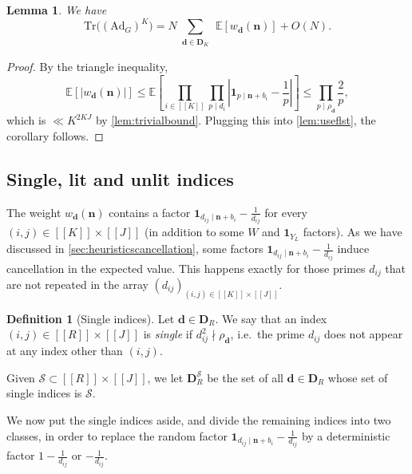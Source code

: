 \documentclass[11pt]{amsart}
\newtheorem{lemma}[theorem]{Lemma}
\theoremstyle{definition}
\newtheorem{definition}[theorem]{Definition}
\renewcommand{\leq}{\leqslant}
\newcommand{\sinterval}[1]{[\![#1]\!] }
\newcommand{\abs}[1]{\left|#1\right|}
\newcommand{\ind}[1]{\mathbf{1}_{#1}}
\newcommand{\E}{\mathbb{E}}
\newcommand{\Ad}{\mathrm{Ad}}
\newcommand{\Tr}{\mathrm{Tr}}
\renewcommand{\d}{\boldsymbol{d}}
\newcommand{\pcomp}[2]{d_{#1#2}}
\newcommand{\n}{\mathbf{n}}
\newcommand{\graph}{G}
\newcommand{\sommespart}{b}
\newcommand{\fprod}[1]{\rho_{#1}}
\newcommand{\pall}{\fprod{\d}}
\newcommand{\s}{\mathcal{S}}
\newcommand{\fancyD}{\mathbf{D}}
\newcommand{\Dsf}{\fancyD_{\!\repK}}
\newcommand{\DsfR}{\fancyD_{\!\tupsize}}
\newcommand{\DsR}{\fancyD^{\s}_{\!\tupsize}}
\newcommand{\elln}{L}
\newcommand{\Y}{Y_{\!\elln}}
\newcommand{\repR}{J}
\newcommand{\repK}{K}
\newcommand{\newK}{\sinterval{K}}
\newcommand{\newR}{\sinterval{J}}
\newcommand{\newerKR}{\newK\times\newR}
\newcommand{\newerKRR}{\sinterval{\tupsize}\times\newR}
\newcommand{\tupsize}{R}
\begin{document}
\begin{lemma}
\label{cor:traceexpressioncleaned}
We have 
\begin{equation*}
	\Tr \big((\Ad_{\graph})^{\repK}\big) = N \sum_{\substack{\d\in \Dsf}}\,   \E \left[w_{\d}(\n) \right] + O(N).
\end{equation*}
\end{lemma}
\begin{proof}
By the triangle inequality,
\begin{equation*}
	\mathbb{E}\left[ \abs{ w_{\d}(\n)   }\right] \leq \mathbb{E}\left[\prod_{i\in \newK} \prod_{p\mid d_i} \abs{\ind{p\mid \n + \sommespart_i} - \frac{1}{p}} \right] \leq \prod_{p\mid \pall}\frac{2}{p},
\end{equation*}
which is $\ll \repK^{2\repK\repR}$ by \cref{lem:trivialbound}. Plugging this into \cref{lem:useflst}, the corollary follows.
\end{proof}


\subsection{Single, lit and unlit indices}
The weight $w_{\d}(\n)$ contains a factor $\ind{\pcomp{i}{j}\mid \n+\sommespart_i} - \frac{1}{\pcomp{i}{j}}$ for every $(i,j)\in \newerKR$ (in addition to some $W$ and $\ind{\Y}$ factors). As we have discussed in \cref{sec:heuristicscancellation}, some factors $\ind{\pcomp{i}{j}\mid \n+\sommespart_i} - \frac{1}{\pcomp{i}{j}}$ induce cancellation in the expected value. This happens exactly for those primes $\pcomp{i}{j}$ that are not repeated in the array $(\pcomp{i}{j})_{(i,j)\in \newerKR}$.

\begin{definition}[Single indices]
\label{def:repeatedsingle}
Let $\d\in \DsfR$. We say that an index $(i,j)\in \newerKRR$ is \emph{single} if $\pcomp{i}{j}^2\nmid \pall$, i.e.~the prime $\pcomp{i}{j}$ does not appear at any index other than $(i,j)$.

Given $\s \subset \newerKRR$, we let $\DsR$ be the set of all $\d\in \DsfR$ whose set of single indices is $\s$.
\end{definition}

We now put the single indices aside, and divide the remaining indices into two classes, in order to replace the random factor $\ind{\pcomp{i}{j}\mid \n+\sommespart_i} - \frac{1}{\pcomp{i}{j}}$ by a deterministic factor $1-\frac{1}{\pcomp{i}{j}}$ or $-\frac{1}{\pcomp{i}{j}}$.
\end{document}
